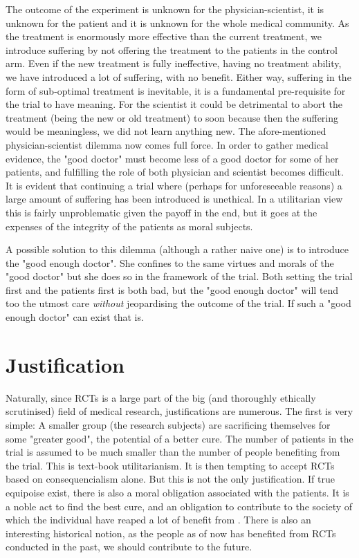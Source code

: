 \documentclass[12p]{article}
\begin{document}
The outcome of the experiment is unknown for the physician-scientist, it is unknown for the patient and it is unknown for the whole medical community.
As the treatment is enormously more effective than the current treatment, we introduce suffering by not offering the treatment to the patients in the control arm.
Even if the new treatment is fully ineffective, having no treatment ability, we have introduced a lot of suffering, with no benefit.
Either way, suffering in the form of sub-optimal treatment is inevitable, it is a fundamental pre-requisite for the trial to have meaning.
For the scientist it could be detrimental to abort the treatment (being the new or old treatment) to soon because then the suffering would be meaningless, we did not learn anything new.
The afore-mentioned physician-scientist dilemma now comes full force.
In order to gather medical evidence, the "good doctor" must become less of a good doctor for some of her patients, and fulfilling the role of both physician and scientist becomes difficult.
It is evident that continuing a trial where (perhaps for unforeseeable reasons) a large amount of suffering has been introduced is unethical.
In a utilitarian view this is fairly unproblematic given the payoff in the end, but it goes at the expenses of the integrity of the patients as moral subjects.

A possible solution to this dilemma (although a rather naive one) is to introduce the "good enough doctor".
She confines to the same virtues and morals of the "good doctor" but she does so in the framework of the trial.
Both setting the trial first and the patients first is both bad, but the "good enough doctor" will tend too the utmost care \emph{without} jeopardising the outcome of the trial.
If such a "good enough doctor" can exist that is.

\section*{Justification}

Naturally, since RCTs is a large part of the big (and thoroughly ethically scrutinised) field of medical research, justifications are numerous.
The first is very simple:
A smaller group (the research subjects) are sacrificing themselves for some "greater good", the potential of a better cure.
The number of patients in the trial is assumed to be much smaller than the number of people benefiting from the trial.
This is text-book utilitarianism.%
It is then tempting to accept RCTs based on consequencialism alone.
But this is not the only justification.
If true equipoise exist, there is also a moral obligation associated with the patients.
It is a noble act to find the best cure, and an obligation to contribute to the society of which the individual have reaped a lot of benefit from \cite{platonweb}.
There is also an interesting historical notion, as the people as of now has benefited from RCTs conducted in the past, we should contribute to the future.
\end{document}

